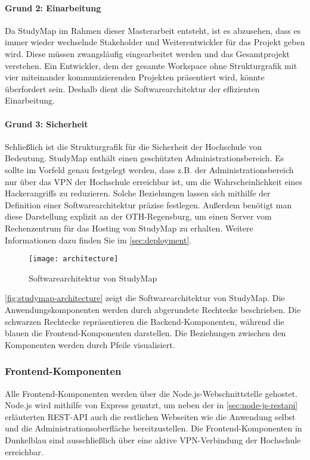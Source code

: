 \paragraph*{Grund 2: Einarbeitung}
Da StudyMap im Rahmen dieser Masterarbeit entsteht, ist es abzusehen, dass es immer wieder wechselnde Stakeholder und Weiterentwickler für das Projekt geben wird. Diese müssen zwangsläufig eingearbeitet werden und das Gesamtprojekt verstehen. Ein Entwickler, dem der gesamte Workspace ohne Strukturgrafik mit vier miteinander kommunizierenden Projekten präsentiert wird, könnte überfordert sein. Deshalb dient die Softwarearchitektur der effizienten Einarbeitung.

\paragraph*{Grund 3: Sicherheit}
Schließlich ist die Strukturgrafik für die Sicherheit der Hochschule von Bedeutung. StudyMap enthält einen geschützten Administrationsbereich. Es sollte im Vorfeld genau festgelegt werden, dass z.B. der Administrationsbereich nur über das VPN der Hochschule erreichbar ist, um die Wahrscheinlichkeit eines Hackerangriffs zu reduzieren. Solche Beziehungen lassen sich mithilfe der Definition einer Softwarearchitektur präzise festlegen. Außerdem benötigt man diese Darstellung explizit an der OTH-Regensburg, um einen Server vom Rechenzentrum für das Hosting von StudyMap zu erhalten. Weitere Informationen dazu finden Sie im \autoref{sec:deployment}.

\begin{figure}[H]
    \centering
    \texttt{[image: architecture]}
    \caption{Softwarearchitektur von StudyMap}
    \label{fig:studymap-architecture}
\end{figure}

\autoref{fig:studymap-architecture} zeigt die Softwarearchitektur von StudyMap. Die Anwendungskomponenten werden durch abgerundete Rechtecke beschrieben. Die schwarzen Rechtecke repräsentieren die Backend-Komponenten, während die blauen die Frontend-Komponenten darstellen. Die Beziehungen zwischen den Komponenten werden durch Pfeile visualisiert.

\subsubsection{Frontend-Komponenten}\label{sec:frontend-komponenten}
Alle Frontend-Komponenten werden über die Node.js-Webschnittstelle gehostet. Node.js wird mithilfe von Express genutzt, um neben der in \autoref{sec:node-js-restapi} erläuterten REST-API auch die restlichen Webseiten wie die Anwendung selbst und die Administrationsoberfläche bereitzustellen. Die Frontend-Komponenten in Dunkelblau sind ausschließlich über eine aktive VPN-Verbindung der Hochschule erreichbar.

